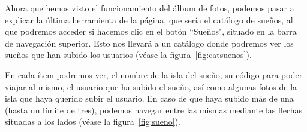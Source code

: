 
\clearpage

Ahora que hemos visto el funcionamiento del álbum de fotos, podemos pasar a explicar la última herramienta de la página, que sería el catálogo de sueños, al que podremos acceder si hacemos clic en el botón ``Sueños", situado en la barra de navegación superior. Esto nos llevará a un catálogo donde podremos ver los sueños que han subido los usuarios {(v\'ease la figura~\ref{fig:catsuenos})}.\\


En cada ítem podremos ver, el nombre de la isla del sueño, su código para poder viajar al mismo, el usuario que ha subido el sueño, así como algunas fotos de la isla que haya querido subir el usuario. En caso de que haya subido más de una (hasta un límite de tres), podemos navegar entre las mismas mediante las flechas situadas a los lados {(v\'ease la figura~\ref{fig:sueno})}.\\

